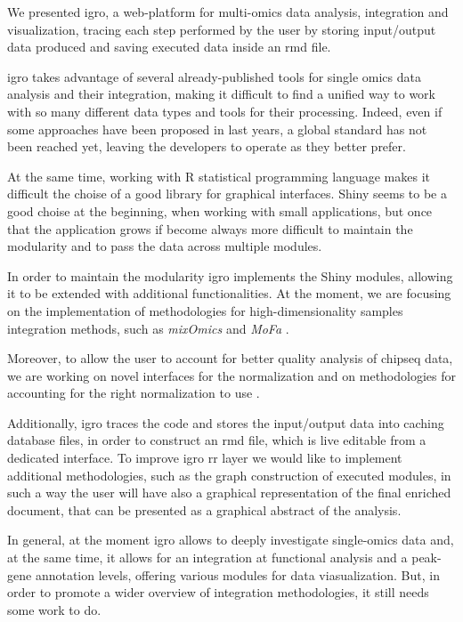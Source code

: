 We presented \gls{igro}, a web-platform for multi-omics data analysis, integration and visualization, tracing each step performed by the user by storing input/output data produced and saving executed data inside an \gls{rmd} file.

\gls{igro} takes advantage of several already-published tools for single omics data analysis and their integration, making it difficult to find a unified way to work with so many different data types and tools for their processing.
Indeed, even if some approaches have been proposed in last years, a global standard has not been reached yet, leaving the developers to operate as they better prefer.

At the same time, working with R statistical programming language makes it difficult the choise of a good library for graphical interfaces.
Shiny seems to be a good choise at the beginning, when working with small applications, but once that the application grows if become always more difficult to maintain the modularity and to pass the data across multiple modules.

In order to maintain the modularity \gls{igro} implements the Shiny modules, allowing it to be extended with additional functionalities. At the moment, we are focusing on the implementation of methodologies for high-dimensionality samples integration methods, such as \textit{mixOmics} \cite{Rohart2017} and \textit{MoFa} \cite{Argelaguet2018}.

Moreover, to allow the user to account for better quality analysis of \gls{chipseq} data, we are working on novel interfaces for the normalization and on methodologies for accounting for the right normalization to use \cite{Angelini2015}.

Additionally, \gls{igro} traces the code and stores the input/output data into caching database files, in order to construct an \gls{rmd} file, which is live editable from a dedicated interface.
To improve \gls{igro} \gls{rr} layer we would like to implement additional methodologies, such as the graph construction of executed modules, in such a way the user will have also a graphical representation of the final enriched document, that can be presented as a graphical abstract of the analysis.

In general, at the moment \gls{igro} allows to deeply investigate single-omics data and, at the same time, it allows for an integration at functional analysis and a peak-gene annotation levels, offering various modules for data viasualization.
But, in order to promote a wider overview of integration methodologies, it still needs some work to do.
